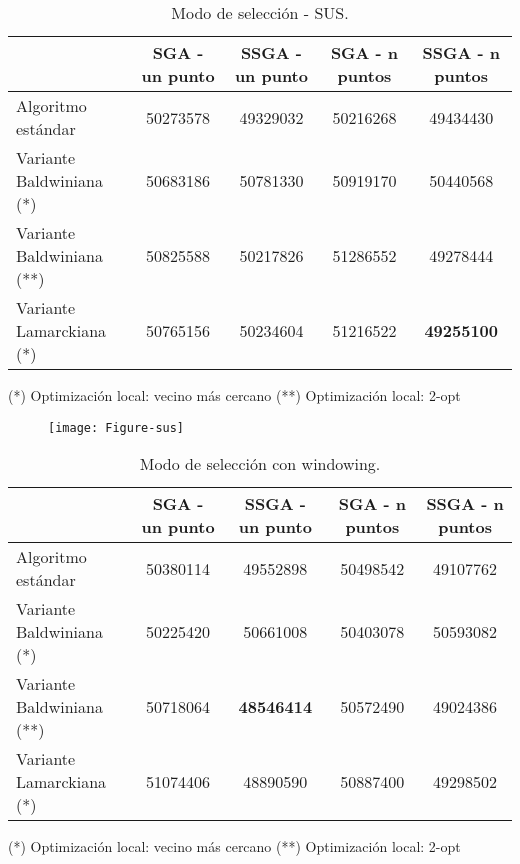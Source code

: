 \documentclass[10pt]{article}
\begin{document}

\begin{table}[htb]
\centering
\begin{tabular}{| l | c | c | c | c |}
\hline
& SGA - un punto & SSGA - un punto & SGA - n puntos & SSGA - n puntos \\
\hline
Algoritmo estándar  & 50273578 & 49329032  & 50216268  & 49434430\\ \cline{1-5}
Variante Baldwiniana (*) & 50683186 & 50781330  & 50919170 & 50440568\\ \cline{1-5}
Variante Baldwiniana (**) & 50825588 & 50217826  & 51286552 & 49278444\\ \cline{1-5}
Variante Lamarckiana (*) & 50765156 & 50234604 & 51216522 & \textbf{49255100}\\ 
\hline
\end{tabular}
{    (*) Optimización local: vecino más cercano} 
{    (**) Optimización local: 2-opt} 
\caption{Modo de selección - SUS.}
\end{table}

\begin{figure}[H]
	\begin{center}
 		\texttt{[image: Figure-sus]}
	\end{center} 
\end{figure}


\begin{table}[htb]
\centering
\begin{tabular}{| l | c | c | c | c |}
\hline
& SGA - un punto & SSGA - un punto & SGA - n puntos & SSGA - n puntos \\
\hline
Algoritmo estándar  & 50380114 & 49552898  & 50498542  & 49107762\\ \cline{1-5}
Variante Baldwiniana (*) & 50225420 & 50661008  & 50403078 & 50593082\\ \cline{1-5}
Variante Baldwiniana (**) & 50718064 & \textbf{48546414}  & 50572490 & 49024386\\ \cline{1-5}
Variante Lamarckiana (*) & 51074406 & 48890590 & 50887400 & 49298502\\ 
\hline
\end{tabular}
{    (*) Optimización local: vecino más cercano                                 } 
{    (**) Optimización local: 2-opt} 
\caption{Modo de selección con windowing.}
\end{table}
\end{document}
